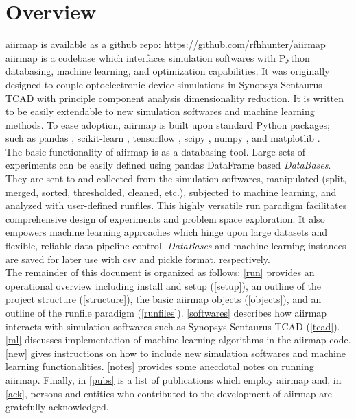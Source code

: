 \documentclass[a4paper,12pt,english]{article}
\begin{document}
	
	\newpage             
	\tableofcontents      
	\newpage

    \section{Overview} \label{overview}
    aiirmap is available as a github repo: 
    \url{https://github.com/rfhhunter/aiirmap} \\
    
    aiirmap is a codebase which interfaces simulation softwares with Python databasing, machine learning, and optimization capabilities. It was originally designed to couple optoelectronic device simulations in Synopsys Sentaurus TCAD \cite{tcad} with principle component analysis \cite{pca1, pca2} dimensionality reduction. It is written to be easily extendable to new simulation softwares and machine learning methods. To ease adoption, aiirmap is built upon standard Python packages; such as pandas \cite{pandas1, pandas2}, scikit-learn \cite{sklearn}, tensorflow \cite{tensorflow}, scipy \cite{scipy}, numpy \cite{numpy}, and matplotlib \cite{matplotlib}. \\
    
    The basic functionality of aiirmap is as a databasing tool. Large sets of experiments can be easily defined using pandas DataFrame based \textit{DataBases}. They are sent to and collected from the simulation softwares, manipulated (split, merged, sorted, thresholded, cleaned, etc.), subjected to machine learning, and analyzed with user-defined runfiles. This highly versatile run paradigm facilitates comprehensive design of experiments and problem space exploration. It also empowers machine learning approaches which hinge upon large datasets and flexible, reliable data pipeline control. \textit{DataBases} and machine learning instances are saved for later use with csv and pickle format, respectively.   \\         

    The remainder of this document is organized as follows: \autoref{run} provides an operational overview including install and setup (\autoref{setup}), an outline of the project structure (\autoref{structure}), the basic aiirmap objects (\autoref{objects}), and an outline of the runfile paradigm (\autoref{runfiles}). \autoref{softwares} describes how aiirmap interacts with simulation softwares such as Synopsys Sentaurus TCAD (\autoref{tcad}). \autoref{ml} discusses implementation of  machine learning algorithms in the aiirmap code. \autoref{new} gives instructions on how to include new simulation softwares and machine learning functionalities. \autoref{notes} provides some anecdotal notes on running aiirmap. Finally, in \autoref{pubs} is a list of publications which employ aiirmap and, in \autoref{ack}, persons and entities who contributed to the development of aiirmap are gratefully acknowledged. \\  
    
\end{document}
